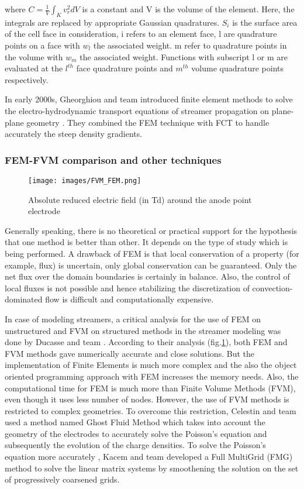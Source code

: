 \documentclass[paper=a4, fontsize=13pt]{scrartcl}
\begin{document}
where $C=\frac{1}{V} \int_{K}v^{2}_{r} dV$ is a constant and V is the volume of the element. Here, the integrals are replaced by appropriate Gaussian quadratures. $S_i$ is the surface area of the cell face in consideration, i refers to an element face, l are quadrature points on a face with $w_l$ the associated weight. m refer to quadrature points in the volume with $w_m$ the associated weight. Functions with subscript l or m are evaluated at the $l^{th}$ face quadrature points and $m^{th}$ volume quadrature points respectively.

In early 2000s, Gheorghiou and team introduced finite element methods to solve the electro-hydrodynamic transport equations of streamer propagation on plane-plane geometry \cite{Georghiou1999AnAlgorithm}. They combined the FEM technique with FCT to handle accurately the steep density gradients.

\subsubsection{FEM-FVM comparison and other techniques}

\begin{figure}
\centering
\texttt{[image: images/FVM\_FEM.png]}
 \caption{Absolute reduced electric field (in Td) around the anode point electrode \cite{Ducasse2007CriticalMethods} }
  \label{fig:FEM vs FVM}
\end{figure}

Generally speaking, there is no theoretical or practical support for the hypothesis that one method is better than other. It depends on the type of study which is being performed. A drawback of FEM is that local conservation of a property (for example, flux) is uncertain, only global conservation can be guaranteed. Only the net flux over the domain boundaries is certainly in balance. Also, the control of local fluxes is not possible and hence stabilizing the discretization of convection-dominated flow is difficult and computationally expensive.

In case of modeling streamers, a critical analysis for the use of FEM on unstructured and FVM on structured methods in the streamer modeling was done by Ducasse and team \cite{Ducasse2007CriticalMethods}. According to their analysis (fig.\ref{fig:FEM vs FVM}), both FEM and FVM methods gave numerically accurate and close solutions. But the implementation of Finite Elements is much more complex and the also the object oriented programming approach with FEM increases the memory needs. Also, the computational time for FEM is much more than Finite Volume Methods (FVM), even though it uses less number of nodes. However, the use of FVM methods is restricted to complex geometries. To overcome this restriction, Celestin and team \cite{Celestin2009TheGeometries} used a method named Ghost Fluid Method which takes into account the geometry of the electrodes to accurately solve the Poisson's equation and subsequently the evolution of the charge densities. To solve the Poisson's equation more accurately , Kacem and team \cite{Kacem2012FullPressure} developed a Full MultiGrid (FMG) method to solve the linear matrix systems by smoothening the solution on the set of progressively coarsened grids.
\end{document}
